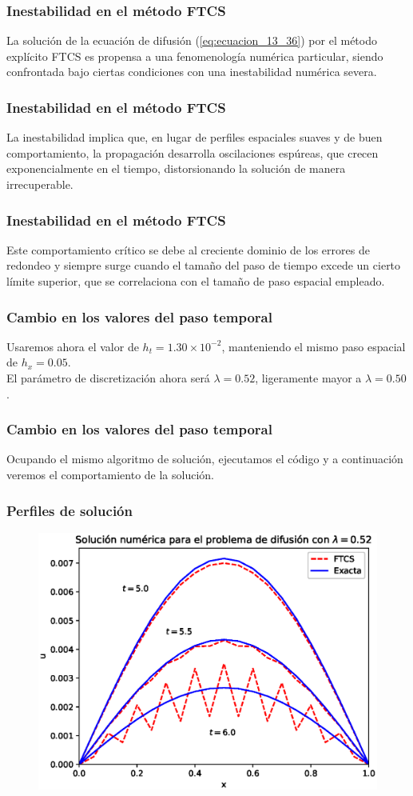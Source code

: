 \documentclass[12pt]{beamer}
\begin{document}
\begin{frame}
\frametitle{Inestabilidad en el método FTCS}
La solución de la ecuación de difusión (\ref{eq:ecuacion_13_36}) por el método explícito FTCS es propensa a una fenomenología numérica particular, siendo confrontada bajo ciertas condiciones con una inestabilidad numérica severa.
\end{frame}
\begin{frame}
\frametitle{Inestabilidad en el método FTCS}
La inestabilidad implica que, en lugar de perfiles espaciales suaves y de buen comportamiento, la propagación desarrolla oscilaciones espúreas, que crecen exponencialmente en el tiempo, distorsionando la solución de manera irrecuperable.
\end{frame}
\begin{frame}
\frametitle{Inestabilidad en el método FTCS}
Este comportamiento crítico se debe al creciente dominio de los errores de redondeo y siempre surge cuando el tamaño del paso de tiempo excede un cierto límite superior, que se correlaciona con el tamaño de paso espacial empleado.
\end{frame}	
\begin{frame}
\frametitle{Cambio en los valores del paso temporal}
Usaremos ahora el valor de $h_{t}=1.30 \times 10^{-2}$, manteniendo el mismo paso espacial de $h_{x}=0.05$.
\\
\bigskip
\pause
El parámetro de discretización ahora será $\lambda=0.52$, ligeramente mayor a $\lambda=0.50$.
\end{frame}
\begin{frame}
\frametitle{Cambio en los valores del paso temporal}
Ocupando el mismo algoritmo de solución, ejecutamos el código y a continuación veremos el comportamiento de la solución.
\end{frame}
{
\begin{frame}
\frametitle{Perfiles de solución}
\begin{figure}
	\centering
	\includegraphics[scale=0.6]{Imagenes/solucionFTSC_03.eps}
\end{figure}
\end{frame}
}
\end{document}
